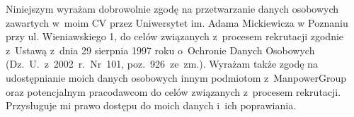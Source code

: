 \documentclass[10pt,a4paper]{moderncv}
\begin{document}
\renewcommand{\listitemsymbol}{-} %


\vfill
\begin{center}
\scriptsize Niniejszym wyrażam dobrowolnie zgodę na przetwarzanie danych osobowych zawartych w~moim CV przez Uniwersytet im. Adama Mickiewicza w Poznaniu przy ul. Wieniawskiego 1, do celów związanych z~procesem rekrutacji zgodnie z~Ustawą z~dnia 29 sierpnia 1997 roku o~Ochronie Danych Osobowych (Dz.~U.~z~2002~r.~Nr~101, poz.~926~ze~zm.). Wyrażam także zgodę na udostępnianie moich danych osobowych innym podmiotom z~ManpowerGroup oraz potencjalnym pracodawcom do celów związanych z~procesem rekrutacji. Przysługuje mi prawo dostępu do moich danych i~ich poprawiania.
\end{center}
\end{document}
